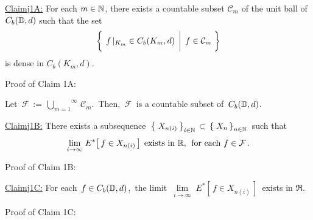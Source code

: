 \vskip 0.8cm
\begin{center}\begin{minipage}{6.5in}
\underline{Claim{{\color{white}j}}1A:}\;\;
For each $m \in \N$, there exists a countable subset $\mathcal{C}_{m}$
of the unit ball of $C_{b}(\D,d)$ such that the set
\begin{equation*}
\left\{\;
	\left.
	f\,\vert_{K_{m}} \overset{{\color{white}1}}{\in} C_{b}(K_{m},d)
	\,\;\right\vert\;
	f \in \mathcal{C}_{m}
\;\right\}
\end{equation*}
is dense in $C_{b}(K_{m},d)$.
\end{minipage}\end{center}
Proof of Claim 1A:\;\;

\vskip 0.5cm
\noindent
Let \,$\mathcal{F} \,:=\, \overset{\infty}{\underset{m=1}{\bigcup}}\,\mathcal{C}_{m}$.\,
Then, \,$\mathcal{F}$\, is a countable subset of \,$C_{b}(\D,d)$.\,

\vskip 0.8cm
\begin{center}\begin{minipage}{6.5in}
\underline{Claim{{\color{white}j}}1B:}\;\;
There exists a subsequence
\,$\left\{\;X_{n(i)}\,\right\}_{i\in\N} \,\subset\, \left\{\;X_{n}\,\right\}_{n\in\N}$\,
such that %
\begin{equation*}
\underset{i\rightarrow\infty}{\lim}\; E^{*}\!\left[\,f \in X_{n(i)}\,\right]
\;\textnormal{exists in $\Re$, \;for each $f \in \mathcal{F}$}\,.
\end{equation*}
\end{minipage}\end{center}
Proof of Claim 1B:\;\;

\vskip 0.8cm
\begin{center}\begin{minipage}{6.5in}
\underline{Claim{{\color{white}j}}1C:}\;\;
For each \,$f \in C_{b}(\D,d)$,\, the limit
\,$\underset{i\rightarrow\infty}{\lim}\; E^{*}\!\left[\,f \in X_{n(i)}\,\right]$\,
exists in $\Re$.
\end{minipage}\end{center}
Proof of Claim 1C:\;\;

